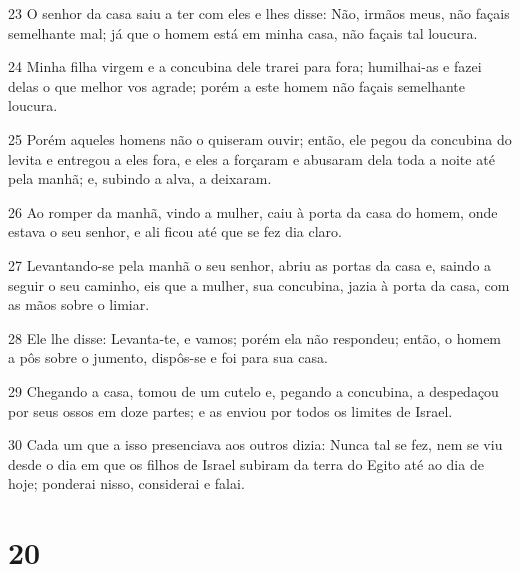 \par 23 O senhor da casa saiu a ter com eles e lhes disse: Não, irmãos meus, não façais semelhante mal; já que o homem está em minha casa, não façais tal loucura.
\par 24 Minha filha virgem e a concubina dele trarei para fora; humilhai-as e fazei delas o que melhor vos agrade; porém a este homem não façais semelhante loucura.
\par 25 Porém aqueles homens não o quiseram ouvir; então, ele pegou da concubina do levita e entregou a eles fora, e eles a forçaram e abusaram dela toda a noite até pela manhã; e, subindo a alva, a deixaram.
\par 26 Ao romper da manhã, vindo a mulher, caiu à porta da casa do homem, onde estava o seu senhor, e ali ficou até que se fez dia claro.
\par 27 Levantando-se pela manhã o seu senhor, abriu as portas da casa e, saindo a seguir o seu caminho, eis que a mulher, sua concubina, jazia à porta da casa, com as mãos sobre o limiar.
\par 28 Ele lhe disse: Levanta-te, e vamos; porém ela não respondeu; então, o homem a pôs sobre o jumento, dispôs-se e foi para sua casa.
\par 29 Chegando a casa, tomou de um cutelo e, pegando a concubina, a despedaçou por seus ossos em doze partes; e as enviou por todos os limites de Israel.
\par 30 Cada um que a isso presenciava aos outros dizia: Nunca tal se fez, nem se viu desde o dia em que os filhos de Israel subiram da terra do Egito até ao dia de hoje; ponderai nisso, considerai e falai.

\chapter{20}

